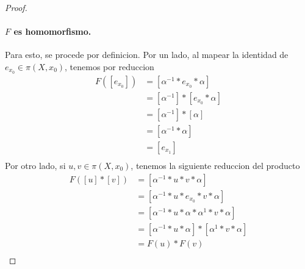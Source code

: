 {\begin{proof}
  \paragraph{\(F\) es homomorfismo.} Para esto, se procede por
  definicion. Por un lado, al mapear la identidad de \(e_{x_0} \in \pi
  (X, x_0) \), tenemos por reduccion
  \begin{align*}
    F ([e_{x_0}]) &= [\alpha^{-1} * e_{x_0} * \alpha] \\
                 &= [\alpha^{-1}] * [e_{x_0} * \alpha] \\
                 &= [\alpha^{-1}] * [\alpha] \\
                 &= [\alpha^{-1} * \alpha] \\
                 &= [e_{x_1}] \\
  \end{align*}
  Por otro lado, si \(u,v \in \pi (X, x_0) \), tenemos la siguiente
  reduccion del producto
  \begin{align*}
    F ([u] * [v]) &= [\alpha^{-1} * u * v * \alpha] \\
    &= [\alpha^{-1} * u * e_{x_0} * v * \alpha] \\
    &= [\alpha^{-1} * u * \alpha * \alpha^{1} * v * \alpha] \\
    &= [\alpha^{-1} * u * \alpha ] * [ \alpha^{1} * v * \alpha] \\
    &= F (u) * F (v) \\
  \end{align*}


\end{proof}}

